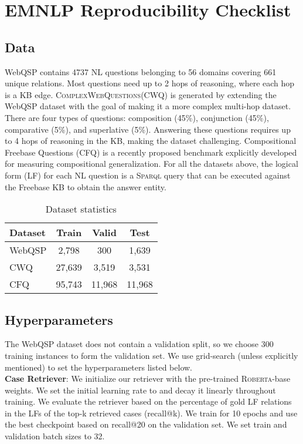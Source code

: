 \documentclass[11pt]{article}
\newcommand{\roberta}{\textsc{Roberta}\xspace}
\newcommand{\cwq}{\textsc{ComplexWebQuestions}\xspace}
\begin{document}
\appendix

\clearpage

\section{EMNLP Reproducibility Checklist}
\label{sec:appendix_data_hyper_param}
\subsection{Data}
\label{sub:appendix_data}
WebQSP contains 4737 NL questions belonging to 56 domains covering 661 unique relations. Most questions need up to 2 hops of reasoning, where each hop is a KB edge. \cwq (CWQ) is generated by extending the WebQSP dataset with the goal of making it a more complex multi-hop dataset. There are four types of questions: composition (45\%), conjunction (45\%), comparative (5\%), and superlative (5\%). Answering these questions requires up to 4 hops of reasoning in the KB, making the dataset challenging. Compositional Freebase Questions (CFQ) is a recently proposed benchmark explicitly developed for measuring compositional generalization. For all the datasets above, the logical form (LF) for each NL question is a \textsc{Sparql} query that can be executed against the Freebase KB to obtain the answer entity.

\begin{table}[]
    \centering
    \begin{tabular}{l c c c}\toprule
         Dataset & Train & Valid & Test \\\midrule
         WebQSP & 2,798 & 300 & 1,639\\
         CWQ & 27,639 & 3,519 & 3,531 \\
         CFQ & 95,743 & 11,968 & 11,968 \\\bottomrule
         
    \end{tabular}
    \caption{Dataset statistics}
    \label{tab:data_stats}
\end{table}

\subsection{Hyperparameters}
\label{sub:appendix_hyperparam}

The WebQSP dataset does not contain a validation split, so we choose 300 training instances to form the validation set. We use grid-search (unless explicitly mentioned) to set the hyperparameters listed below.\\
\noindent\textbf{Case Retriever}: We initialize our retriever with the pre-trained \roberta-base weights. We set the initial learning rate to  and decay it linearly throughout training. We evaluate the retriever based on the percentage of gold LF relations in the LFs of the top-k retrieved cases (recall@k). We train for 10 epochs and use the best checkpoint based on recall@20 on the validation set. We set train and validation batch sizes to 32.
\end{document}
